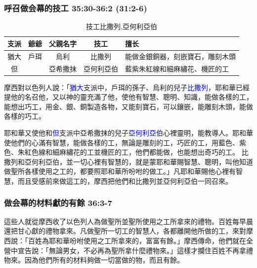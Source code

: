 \begin{table}
\subsubsection{呼召做会幕的技工 35:30-36:2 (31:2-6)}
\begin{table}
\vspace*{-\baselineskip}
\center
\begin{tabular}{ c c c c l }
\toprule
支派 &爺爺 &父親名字&技工 &擅长\\\hline
猶大&戶珥  &烏利 &比撒列  &能做金銀銅器，刻嵌寶石，雕刻木頭\\\hline
但&  &亞希撒抹&亞何利亞伯 &藍紫朱紅線和細麻繡花、機匠的工\\\hline
\end{tabular}
\caption{技工比撒列,亞何利亞伯}
\end{table}
摩西對以色列人說：「\textcolor{blue}{猶大}支派中，戶珥的孫子、烏利的兒子\textcolor{blue}{比撒列}，耶和華已經提他的名召他，又以神的靈充滿了他，使他有智慧、聰明、知識，能做各樣的工，能想出巧工，用金、銀、銅製造各物，又能刻寶石，可以鑲嵌，能雕刻木頭，能做各樣的巧工。 

耶和華又使他和\textcolor{blue}{但}支派中亞希撒抹的兒子\textcolor{blue}{亞何利亞伯}心裡靈明，能教導人。耶和華使他們的心滿有智慧，能做各樣的工，無論是雕刻的工，巧匠的工，用藍色、紫色、朱紅色線和細麻繡花的工並機匠的工，他們都能做，也能想出奇巧的工。
比撒列和亞何利亞伯，並一切心裡有智慧的，就是蒙耶和華賜智慧、聰明，叫他知道做聖所各樣使用之工的，都要照耶和華所吩咐的做工。」凡耶和華賜他心裡有智慧，而且受感前來做這工的，摩西把他們和比撒列並亞何利亞伯一同召來。

\subsubsection{做会幕的材料獻的有餘 36:3-7}
這些人就從摩西收了以色列人為做聖所並聖所使用之工所拿來的禮物。百姓每早晨還把甘心獻的禮物拿來。凡做聖所一切工的智慧人，各都離開他所做的工，來對摩西說：「百姓為耶和華吩咐使用之工所拿來的，富富有餘。」摩西傳命，他們就在全營中宣告說：「無論男女，不必再為聖所拿什麼禮物來。」這樣才攔住百姓不再拿禮物來。因為他們所有的材料夠做一切當做的物，而且有餘。


\end{table}
